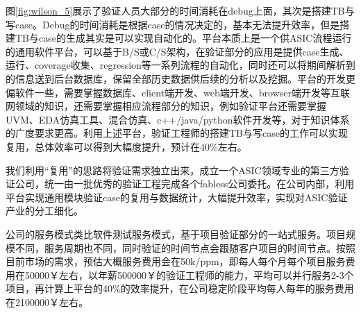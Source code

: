 \documentclass[a4paper,11pt]{article}
\begin{document}
图\ref{fig:wilson_5}展示了验证人员大部分的时间消耗在debug上面，其次是搭建TB与写case。Debug的时间消耗是根据case的情况决定的，基本无法提升效率，但是搭建TB与case的生成其实是可以实现自动化的。平台本质上是一个供ASIC流程运行的通用软件平台，可以基于B/S或C/S架构，在验证部分的应用是提供case生成、运行、coverage收集、regression等一系列流程的自动化，同时还可以将期间解析到的信息送到后台数据库，保留全部历史数据供后续的分析以及挖掘。平台的开发更偏软件一些，需要掌握数据库、client端开发、web端开发、browser端开发等互联网领域的知识，还需要掌握相应流程部分的知识，例如验证平台还需要掌握UVM、EDA仿真工具、混合仿真、c++/java/python软件开发等，对于知识体系的广度要求更高。利用上述平台，验证工程师的搭建TB与写case的工作可以实现复用，总体效率可以得到大幅度提升，预计在40\%左右。

我们利用“复用”的思路将验证需求独立出来，成立一个ASIC领域专业的第三方验证公司，统一由一批优秀的验证工程完成各个fabless公司委托。在公司内部，利用平台实现通用模块验证case的复用与数据统计，大幅提升效率，实现对ASIC验证产业的分工细化。

公司的服务模式类比软件测试服务模式，基于项目验证部分的一站式服务。项目规模不同，服务周期也不同，同时验证的时间节点会跟随客户项目的时间节点。按照目前市场的需求，预估大概服务费用会在50k/ppm，即每人每个月每个项目服务费用在50000￥左右，以年薪500000￥的验证工程师的能力，平均可以并行服务2-3个项目，再计算上平台的40\%的效率提升，在公司稳定阶段平均每人每年的服务费用在2100000￥左右。
\pagebreak
\end{document}
